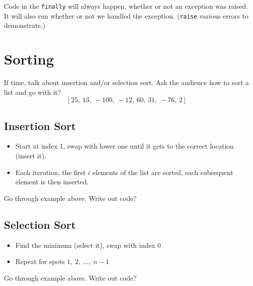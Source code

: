 \documentclass[12pt]{article}
\begin{document}


\noindent
Code in the \lstinline{finally} will always happen, whether or not an exception
was raised.  It will also run whether or not we handled the exception.
(\lstinline{raise} various errors to demonstrate.)

\section{Sorting}

If time, talk about insertion and/or selection sort.  Ask the audience how to
sort a list and go with it?
\[[25,\ 13,\ -100,\ -12,\ 60,\ 31,\ -76,\ 2]\]

\subsection{Insertion Sort}

\begin{itemize}
   \item Start at index 1, swap with lower one until it gets to the correct
      location (insert it).
   \item Each iteration, the first \(i\) elements of the list are sorted, each
      subsequent element is then inserted.
\end{itemize}

Go through example above.  Write out code?



\subsection{Selection Sort}

\begin{itemize}
   \item Find the minimum (select it), swap with index 0
   \item Repeat for spots \(1,\ 2,\ \dots,\ n-1\)
\end{itemize}

Go through example above.  Write out code?


\end{document}
